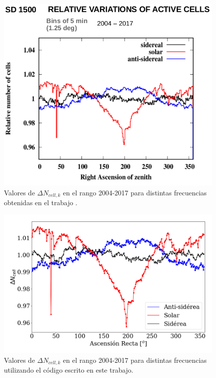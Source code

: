     \begin{figure}[H]
          \centering
              \includegraphics[width=\linewidth]{pesos_referencia.png}  
              \caption{Valores de $\Delta N_{cell, k}$ en el rango 2004-2017 para distintas frecuencias obtenidas en el trabajo \cite{referencia_pesos}.}
              \label{fig:pesos_referencia}
        \end{figure}
       \begin{figure}[H]
          \centering
              \includegraphics[width=\linewidth]{weigths_2020.png}
              \caption{Valores de $\Delta N_{cell, k}$ en el rango 2004-2017 para distintas frecuencias utilizando el código escrito en este trabajo.}
              \label{fig:pesos_ejemplo}
        \end{figure}


